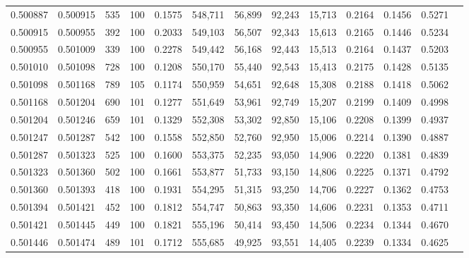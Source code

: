 \begin{tabular}{rrrrrrrrrrrrr}
0.500887 & 0.500915 &   535 & 100 &                                     0.1575 & 548,711 &  56,899 &  92,243 &  15,713 & 0.2164 & 0.1456 & 0.5271 \\
0.500915 & 0.500955 &   392 & 100 &                                     0.2033 & 549,103 &  56,507 &  92,343 &  15,613 & 0.2165 & 0.1446 & 0.5234 \\
0.500955 & 0.501009 &   339 & 100 &                                     0.2278 & 549,442 &  56,168 &  92,443 &  15,513 & 0.2164 & 0.1437 & 0.5203 \\
0.501010 & 0.501098 &   728 & 100 &                                     0.1208 & 550,170 &  55,440 &  92,543 &  15,413 & 0.2175 & 0.1428 & 0.5135 \\
0.501098 & 0.501168 &   789 & 105 &                                     0.1174 & 550,959 &  54,651 &  92,648 &  15,308 & 0.2188 & 0.1418 & 0.5062 \\
0.501168 & 0.501204 &   690 & 101 &                                     0.1277 & 551,649 &  53,961 &  92,749 &  15,207 & 0.2199 & 0.1409 & 0.4998 \\
0.501204 & 0.501246 &   659 & 101 &                                     0.1329 & 552,308 &  53,302 &  92,850 &  15,106 & 0.2208 & 0.1399 & 0.4937 \\
0.501247 & 0.501287 &   542 & 100 &                                     0.1558 & 552,850 &  52,760 &  92,950 &  15,006 & 0.2214 & 0.1390 & 0.4887 \\
0.501287 & 0.501323 &   525 & 100 &                                     0.1600 & 553,375 &  52,235 &  93,050 &  14,906 & 0.2220 & 0.1381 & 0.4839 \\
0.501323 & 0.501360 &   502 & 100 &                                     0.1661 & 553,877 &  51,733 &  93,150 &  14,806 & 0.2225 & 0.1371 & 0.4792 \\
0.501360 & 0.501393 &   418 & 100 &                                     0.1931 & 554,295 &  51,315 &  93,250 &  14,706 & 0.2227 & 0.1362 & 0.4753 \\
0.501394 & 0.501421 &   452 & 100 &                                     0.1812 & 554,747 &  50,863 &  93,350 &  14,606 & 0.2231 & 0.1353 & 0.4711 \\
0.501421 & 0.501445 &   449 & 100 &                                     0.1821 & 555,196 &  50,414 &  93,450 &  14,506 & 0.2234 & 0.1344 & 0.4670 \\
0.501446 & 0.501474 &   489 & 101 &                                     0.1712 & 555,685 &  49,925 &  93,551 &  14,405 & 0.2239 & 0.1334 & 0.4625 \\

\end{tabular}
